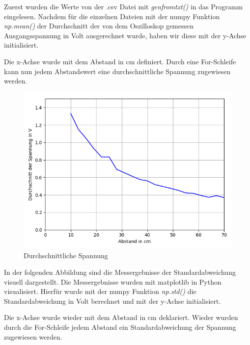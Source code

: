 \documentclass[12pt, oneside, a4paper, \docLanguage]{report}
\begin{document}
Zuerst wurden die Werte von der .csv Datei mit \textit{genfromtxt()} in das Programm eingelesen.
Nachdem für die einzelnen Dateien mit der numpy Funktion \textit{np.mean()} der Durchschnitt der von dem Oszilloskop gemessen Ausgangsspannung in Volt ausgerechnet wurde, haben wir diese mit der y-Achse initialisiert.

Die x-Achse wurde mit dem Abstand in cm definiert. Durch eine For-Schleife kann nun jedem Abstandswert eine durchschnittliche Spannung zugewiesen werden.
\begin{figure}[H]
	\centering\small
	\includegraphics[width=\textwidth]{media/myplot.png}
	\caption{Durchschnittliche Spannung}
	\label{fig:VERSUCH_1_PLOT_DURCHSCNITTLICHE_SAPNNUNG}
\end{figure}

\newpage
In der folgenden Abbildung sind die Messergebnisse der Standardabweichung visuell dargestellt. Die Messergebnisse wurden mit matplotlib in Python visualisiert.
Hierfür wurde mit der numpy Funktion \textit{np.std()} die Standardabweichung in Volt berechnet und mit der y-Achse initialisiert.

Die x-Achse wurde wieder mit dem Abstand in cm deklariert. Wieder wurden durch die For-Schleife jedem Abstand ein Standardabweichung der Spannung zugewiesen werden.
\end{document}
